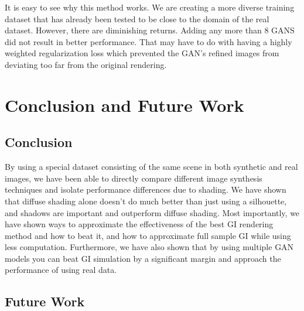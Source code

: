 \documentclass[10pt,twocolumn,letterpaper]{article}
\begin{document}
It is easy to see why this method works. We are creating a more diverse training dataset that has already been tested to be close to the domain of the real dataset.  However, there are diminishing returns.  Adding any more than 8 GANS did not result in better performance.  That may have to do with having a highly weighted regularization loss which prevented the GAN's refined images from deviating too far from the original rendering.  



\section{Conclusion and Future Work}
\subsection{Conclusion}

By using a special dataset consisting of the same scene in both synthetic and real images, we have been able to directly compare different image synthesis techniques and isolate performance differences due to shading.  We have shown that diffuse shading alone doesn't do much better than just using a silhouette, and shadows are important and outperform diffuse shading.  Most importantly, we have shown ways to approximate the effectiveness of the best GI rendering method and how to beat it,  and how to approximate full sample GI while using less computation. Furthermore, we have also shown that by using multiple GAN models you can beat GI simulation by a significant margin and approach the performance of using real data. 

\subsection{Future Work}
\end{document}
